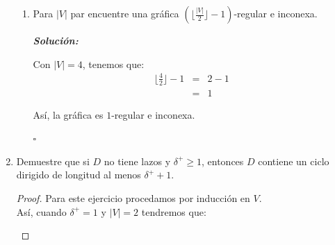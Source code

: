 \documentclass{article}
\begin{document}
\begin{enumerate}
\begin{enumerate}
    \item Para $|V|$ par encuentre una gr\'afica $(\lfloor \frac{|V|}{2}
      \rfloor -1)$-regular e inconexa.

      \textbf{\textit{Solución:}}

      Con $|V| = 4$, tenemos que:
      \begin{eqnarray*}
        \lfloor \frac{4}{2} \rfloor -1 &=& 2 -1\\
        &=& 1
      \end{eqnarray*}

      \begin{figure}[ht!]
        \centering
      \end{figure}

      Así, la gráfica es $1$-regular e inconexa.

      \hfill $\square$ \\
  \end{enumerate}

  \item Demuestre que si $D$ no tiene lazos y $\delta^+ \ge 1$, entonces $D$
    contiene un ciclo dirigido de longitud al menos $\delta^+ + 1$.

    \renewcommand\qedsymbol{QED}
    \begin{proof}
      Para este ejercicio procedamos por inducción en $V$. \\
      Así, cuando $\delta^+ = 1$ y $|V| = 2$ tendremos que:

      \begin{center}
      \end{center}


\end{proof}
\end{enumerate}
\end{document}
